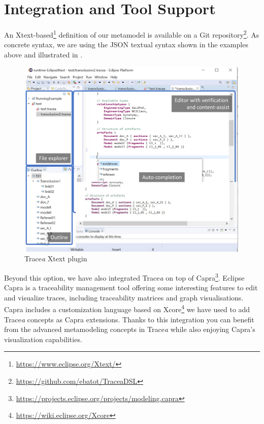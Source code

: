 \section{Integration and Tool Support}\label{sec:integration}

An Xtext-based\footnote{\url{https://www.eclipse.org/Xtext/}} definition of our metamodel is available on a Git repository\footnote{\url{https://github.com/ebatot/TraceaDSL}}. As concrete syntax, we are using the JSON textual syntax shown in the examples above and illustrated in . 

\begin{figure}[ht] 
	\centering
	\includegraphics[width=.7\linewidth]{images/plugin-screenshot.pdf}
	\caption{Trace\textit{a} Xtext plugin}
	
	\label{fig:plugin}
\end{figure}


Beyond this option, we have also integrated Trace\textit{a} on top of Capra\footnote{\url{https://projects.eclipse.org/projects/modeling.capra}}. Eclipse Capra is a traceability management tool offering some interesting features to edit and visualize traces, including traceability matrices and graph visualisations. Capra includes a customization language based on Xcore\footnote{\url{https://wiki.eclipse.org/Xcore}}  we have used to add Trace\textit{a} concepts as Capra extensions. %
Thanks to this integration you can benefit from the advanced metamodeling concepts in Trace\textit{a} while also enjoying Capra's visualization capabilities.  

